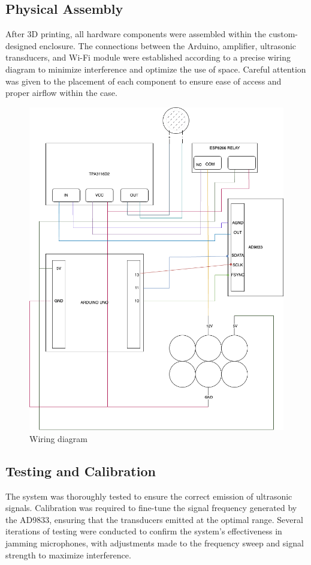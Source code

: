 \subsection{Physical Assembly} After 3D printing, all hardware components were assembled within the custom-designed enclosure. The connections between the Arduino, amplifier, ultrasonic transducers, and Wi-Fi module were established according to a precise wiring diagram to minimize interference and optimize the use of space. Careful attention was given to the placement of each component to ensure ease of access and proper airflow within the case.
\begin{figure}[H]
    \centering
    \includegraphics[width=\linewidth]{images/diagram.drawio.png}
    \caption{Wiring diagram}
\end{figure}
\subsection{Testing and Calibration} The system was thoroughly tested to ensure the correct emission of ultrasonic signals. Calibration was required to fine-tune the signal frequency generated by the AD9833, ensuring that the transducers emitted at the optimal range. Several iterations of testing were conducted to confirm the system's effectiveness in jamming microphones, with adjustments made to the frequency sweep and signal strength to maximize interference.

